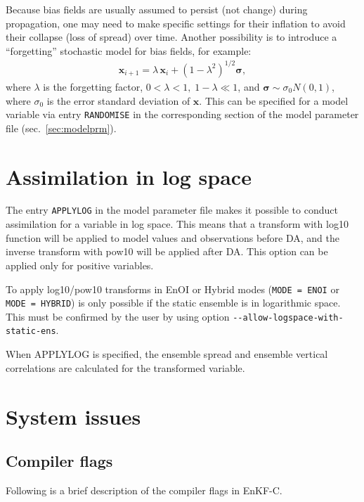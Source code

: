\documentclass[11pt]{report}
\newcommand{\mb} {\mathbf}
\newcommand{\ms} {\boldsymbol}
\begin{document}
Because bias fields are usually assumed to persist (not change) during propagation, one may need to make specific settings for their inflation to avoid their collapse (loss of spread) over time.
Another possibility is to introduce a ``forgetting'' stochastic model for bias fields, for example:
\begin{align*}
  \mb x_{i+1} = \lambda \, \mb x_i + (1 - \lambda^2)^{1/2} \ms \sigma,
\end{align*}
where $\lambda$ is the forgetting factor, $0 < \lambda < 1, \; 1 - \lambda \ll 1$, and $\ms \sigma \sim \sigma_0 N(0, 1)$, where $\sigma_0$ is the error standard deviation of $\mb x$.
This can be specified for a model variable via entry \verb|RANDOMISE| in the corresponding section of the model parameter file (sec.~\ref{sec:modelprm}).

\section{Assimilation in log space}
\label{sec:logspace}

The entry \verb|APPLYLOG| in the model parameter file makes it possible to conduct assimilation for a variable in log space.
This means that a transform with log10 function will be applied to model values and observations before DA, and the inverse transform with pow10 will be applied after DA.
This option can be applied only for positive variables.

To apply log10/pow10 transforms in EnOI or Hybrid modes (\verb|MODE = ENOI| or \verb|MODE = HYBRID|) is only possible if the static ensemble is in logarithmic space.
This must be confirmed by the user by using option \verb|--allow-logspace-with-static-ens|.

When APPLYLOG is specified, the ensemble spread and ensemble vertical correlations are calculated for the transformed variable.

\section{System issues}

\subsection{Compiler flags}
\label{sec:flags}

Following is a brief description of the compiler flags in EnKF-C.
\end{document}
